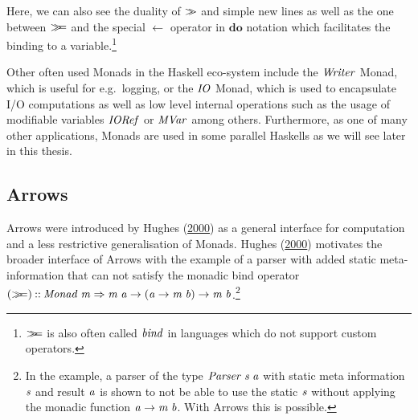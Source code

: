 \documentclass[paper=A4,twoside=true,openright,parskip=full,chapterprefix=true,headings=normal,bibliography=totoc,listof=totoc,titlepage=on,captions=tableabove,draft=false,british]{scrreprt}%
\begin{document}
Here, we can also see the duality of \ensuremath{\sequ } and simple new lines as well
as the one between \ensuremath{\bind } and the special \ensuremath{\leftarrow } operator in \ensuremath{\mathbf{do}}
notation which facilitates the binding to a variable.\footnote{\ensuremath{\bind }
  is also often called \ensuremath{\Varid{bind}} in languages which do not support custom
  operators.}

Other often used Monads in the Haskell eco-system include the \ensuremath{\Conid{Writer}}
Monad, which is useful for e.g.~logging, or the \ensuremath{\Conid{IO}} Monad, which is
used to encapsulate I/O computations as well as low level internal
operations such as the usage of modifiable variables \ensuremath{\Conid{IORef}} or \ensuremath{\Conid{MVar}}
among others. Furthermore, as one of many other applications, Monads are
used in some parallel Haskells as we will see later in this thesis.

\hypertarget{arrows-1}{%
\subsection{Arrows}\label{arrows-1}}

\label{sec:arrows}

Arrows were introduced by Hughes
(\protect\hyperlink{ref-HughesArrows}{2000}) as a general interface for
computation and a less restrictive generalisation of Monads. Hughes
(\protect\hyperlink{ref-HughesArrows}{2000}) motivates the broader
interface of Arrows with the example of a parser with added static
meta-information that can not satisfy the monadic bind operator
\ensuremath{(\bind )\mathbin{::}\Conid{Monad}\;\Varid{m}\Rightarrow \Varid{m}\;\Varid{a}\to (\Varid{a}\to \Varid{m}\;\Varid{b})\to \Varid{m}\;\Varid{b}}.\footnote{In the example,
  a parser of the type \ensuremath{\Conid{Parser}\;\Varid{s}\;\Varid{a}} with static meta information \ensuremath{\Varid{s}} and
  result \ensuremath{\Varid{a}} is shown to not be able to use the static \ensuremath{\Varid{s}} without
  applying the monadic function \ensuremath{\Varid{a}\to \Varid{m}\;\Varid{b}}. With Arrows this is
  possible.}
\end{document}

